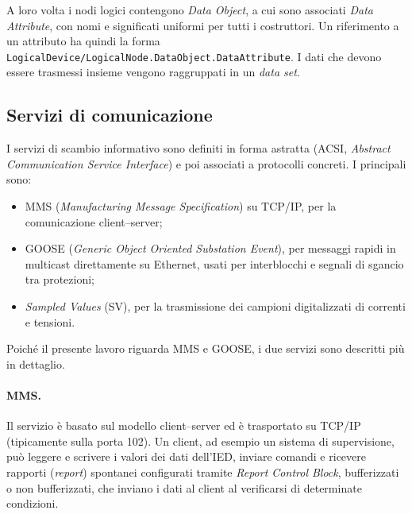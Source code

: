\documentclass[11pt,a4paper,italian,oneside,openany]{book}
\begin{document}
A loro volta i nodi logici contengono \textit{Data Object}, a cui sono associati \textit{Data Attribute}, con nomi e significati uniformi per tutti i costruttori. Un riferimento a un attributo ha quindi la forma \texttt{LogicalDevice/LogicalNode.DataObject.DataAttribute}. I dati che devono essere trasmessi insieme vengono raggruppati in un \textit{data set}.

\subsection{Servizi di comunicazione}
I servizi di scambio informativo sono definiti in forma astratta (ACSI, \textit{Abstract Communication Service Interface}) e poi associati a protocolli concreti. I principali sono:
\begin{itemize}
    \item MMS (\textit{Manufacturing Message Specification}) su TCP/IP, per la comunicazione client--server;
    \item GOOSE (\textit{Generic Object Oriented Substation Event}), per messaggi rapidi in multicast direttamente su Ethernet, usati per interblocchi e segnali di sgancio tra protezioni;
    \item \textit{Sampled Values} (SV), per la trasmissione dei campioni digitalizzati di correnti e tensioni.
\end{itemize}
Poiché il presente lavoro riguarda MMS e GOOSE, i due servizi sono descritti più in dettaglio.

\paragraph{MMS.} Il servizio è basato sul modello client--server ed è trasportato su TCP/IP (tipicamente sulla porta 102). Un client, ad esempio un sistema di supervisione, può leggere e scrivere i valori dei dati dell'IED, inviare comandi e ricevere rapporti (\textit{report}) spontanei configurati tramite \textit{Report Control Block}, bufferizzati o non bufferizzati, che inviano i dati al client al verificarsi di determinate condizioni.
\end{document}
